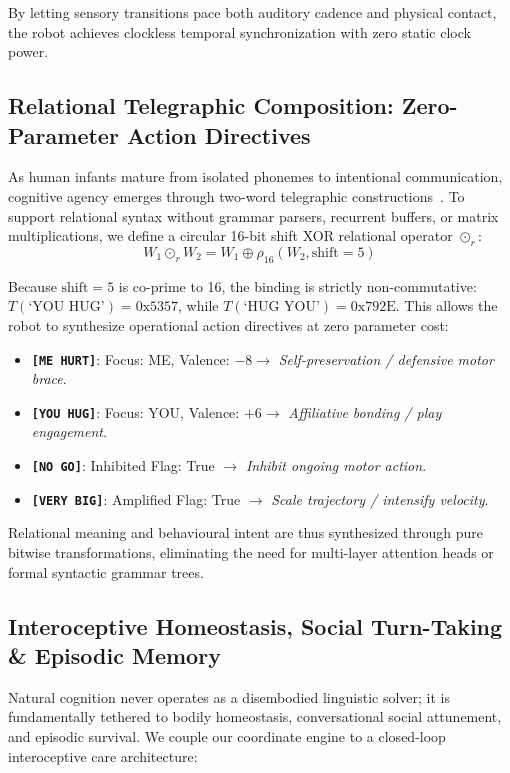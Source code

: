 \documentclass[journal,twocolumn]{IEEEtran}
\begin{document}
By letting sensory transitions pace both auditory cadence and physical contact, the robot achieves clockless temporal synchronization with zero static clock power.

\subsection{Relational Telegraphic Composition: Zero-Parameter Action Directives}
As human infants mature from isolated phonemes to intentional communication, cognitive agency emerges through two-word telegraphic constructions~\cite{brown1973}. To support relational syntax without grammar parsers, recurrent buffers, or matrix multiplications, we define a circular 16-bit shift XOR relational operator $\odot_r$:
\begin{equation}
W_1 \odot_r W_2 = W_1 \oplus \rho_{16}(W_2, \text{shift}=5)
\end{equation}

Because $\text{shift}=5$ is co-prime to 16, the binding is strictly non-commutative: $T(\text{`YOU HUG'}) = 0\text{x}5357$, while $T(\text{`HUG YOU'}) = 0\text{x}792\text{E}$. This allows the robot to synthesize operational action directives at zero parameter cost:
\begin{itemize}
    \item \textbf{\texttt{[ME HURT]}}: Focus: ME, Valence: $-8 \to$ \emph{Self-preservation / defensive motor brace}.
    \item \textbf{\texttt{[YOU HUG]}}: Focus: YOU, Valence: $+6 \to$ \emph{Affiliative bonding / play engagement}.
    \item \textbf{\texttt{[NO GO]}}: Inhibited Flag: True $\to$ \emph{Inhibit ongoing motor action}.
    \item \textbf{\texttt{[VERY BIG]}}: Amplified Flag: True $\to$ \emph{Scale trajectory / intensify velocity}.
\end{itemize}

Relational meaning and behavioural intent are thus synthesized through pure bitwise transformations, eliminating the need for multi-layer attention heads or formal syntactic grammar trees.

\subsection{Interoceptive Homeostasis, Social Turn-Taking \& Episodic Memory}
Natural cognition never operates as a disembodied linguistic solver; it is fundamentally tethered to bodily homeostasis, conversational social attunement, and episodic survival. We couple our coordinate engine to a closed-loop interoceptive care architecture:
\end{document}
